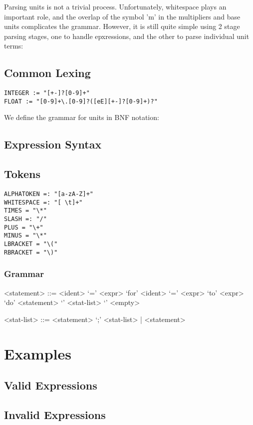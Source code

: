 \documentclass{article}
\begin{document}
Parsing units is not a trivial process. Unfortunately, whitespace plays an important role, and the overlap of the symbol 'm' in the multipliers and base units complicates the grammar. However, it is still quite simple using  2 stage parsing stages, one to handle epxressions, and the other to parse individual unit terms:


\subsection*{Common Lexing}

\begin{verbatim}
INTEGER := "[+-]?[0-9]+"
FLOAT := "[0-9]+\.[0-9]?([eE][+-]?[0-9]+)?"
\end{verbatim}

We define the grammar for units in BNF notation:

\subsection*{Expression Syntax}
\subsection*{Tokens}
\begin{verbatim}
ALPHATOKEN =: "[a-zA-Z]+"
WHITESPACE =: "[ \t]+"
TIMES = "\*"
SLASH =: "/"
PLUS = "\+"
MINUS = "\*"
LBRACKET = "\("
RBRACKET = "\)"
\end{verbatim}

\setlength{\grammarparsep}{20pt plus 1pt minus 1pt} %
\setlength{\grammarindent}{12em} %

\subsubsection*{Grammar}

\begin{grammar}

<statement> ::= <ident> `=' <expr> 
\alt `for' <ident> `=' <expr> `to' <expr> `do' <statement> 
\alt `{' <stat-list> `}' 
\alt <empty> 

<stat-list> ::= <statement> `;' <stat-list> | <statement> 

\end{grammar}

%
%
%
%




\newpage
\section*{Examples}
\subsection*{Valid Expressions}


\subsection*{Invalid Expressions}
\end{document}

